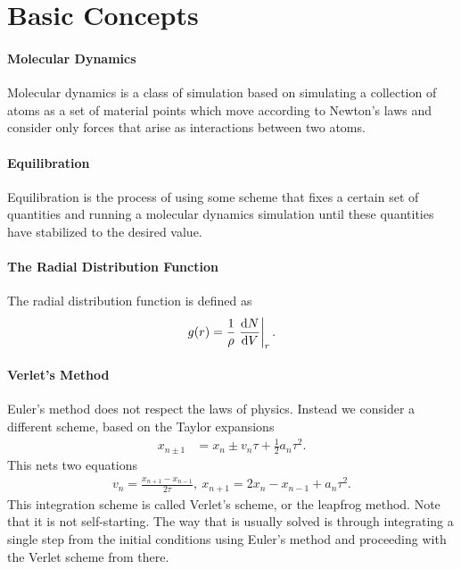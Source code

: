 \section{Basic Concepts}

\paragraph{Molecular Dynamics}
Molecular dynamics is a class of simulation based on simulating a collection of atoms as a set of material points which move according to Newton's laws and consider only forces that arise as interactions between two atoms.

\paragraph{Equilibration}
Equilibration is the process of using some scheme that fixes a certain set of quantities and running a molecular dynamics simulation until these quantities have stabilized to the desired value.

\paragraph{The Radial Distribution Function}
The radial distribution function is defined as
\begin{align*}
	g(r) = \frac{1}{\rho}\eval{\dv{N}{V}}_{r}.
\end{align*}

\paragraph{Verlet's Method}
Euler's method does not respect the laws of physics. Instead we consider a different scheme, based on the Taylor expansions
\begin{align*}
	x_{n \pm 1} &= x_{n} \pm v_{n}\tau + \frac{1}{2}a_{n}\tau^{2}.
\end{align*}
This nets two equations
\begin{align*}
	v_{n} = \frac{x_{n + 1} - x_{n - 1}}{2\tau},\ x_{n + 1} = 2x_{n} - x_{n - 1} + a_{n}\tau^{2}.
\end{align*}
This integration scheme is called Verlet's scheme, or the leapfrog method. Note that it is not self-starting. The way that is usually solved is through integrating a single step from the initial conditions using Euler's method and proceeding with the Verlet scheme from there.

